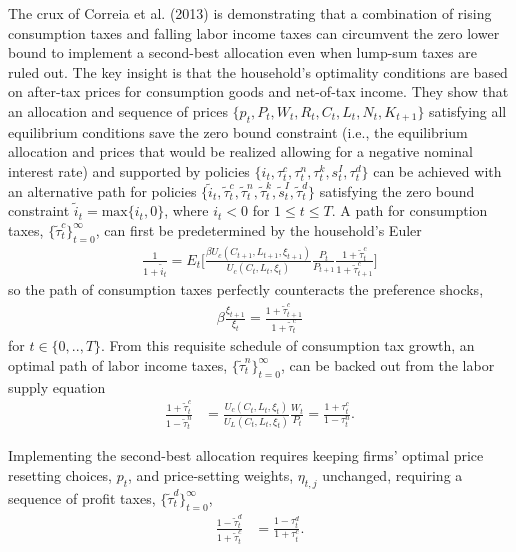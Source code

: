 \documentclass[12pt,letterpaper]{article}
\begin{document}
The crux of Correia et al. (2013) is demonstrating that a combination of rising consumption taxes and falling labor income taxes can circumvent the zero lower bound to implement a second-best allocation even when lump-sum taxes are ruled out.  The key insight is that the household's optimality conditions are based on after-tax prices for consumption goods and net-of-tax income. They show that an allocation and sequence of prices $\{p_t, P_t, W_t, R_t, C_t, L_t, N_t, K_{t+1}\}$ satisfying all equilibrium conditions save the zero bound constraint (i.e., the equilibrium allocation and prices that would be realized allowing for a negative nominal interest rate) and supported by policies $\{i_t, \tau_t^c, \tau_t^n, \tau_t^k, s_t^I, \tau_t^d\}$ can be achieved with an alternative path for policies $\{\tilde{i}_t, \tilde{\tau}_t^c, \tilde{\tau}_t^n, \tilde{\tau}_t^k, \tilde{s}_t^I, \tilde{\tau}_t^d\}$  satisfying the zero bound constraint $\tilde{i}_t = \text{max}\{i_t, 0\}$, where $i_t <0$ for $1 \leq t \leq T$. A path for consumption taxes, $\{ \tilde{\tau}_t^c \}_{t=0}^{\infty}$, can first be predetermined by the household's Euler 
\begin{align}
\frac{1}{1+\tilde{i}_t} = E_t \Big[ \frac{\beta U_c (C_{t+1}, L_{t+1}, \xi_{t+1})}{U_c (C_t, L_t, \xi_t )} \frac{P_t}{P_{t+1}} \frac{1+\tilde{\tau}_t^c} {1+\tilde{\tau}_{t+1}^c}  \Big] \end{align}
so the path of consumption taxes perfectly counteracts the preference shocks,
\begin{align}
\beta \frac{\xi_{t+1}}{\xi_t} = \frac{1 + \tilde{\tau}_{t+1}^{c} }{1 + \tilde{\tau}_t^{c}} 
\end{align}
\noindent for $t \in \{0,..,T\}$. From this requisite schedule of consumption tax growth, an optimal path of labor income taxes, $\{ \tilde{\tau}_t^n \}_{t=0}^{\infty}$, can be backed out from the labor supply equation
\begin{align}
\frac{1+\tilde{\tau}_t^c}{1 - \tilde{\tau}_t^n} &=  \frac{U_c (C_t, L_t, \xi_t )}{U_L (C_t, L_t, \xi_t )}\frac{W_t}{P_t} = \frac{1+\tau_t^c}{1 - \tau_t^n}.  
\end{align}

\noindent Implementing the second-best allocation requires keeping firms' optimal price resetting choices, $p_t$, and price-setting weights, $\eta_{t,j}$ unchanged, requiring a sequence of profit taxes,  $\{ \tilde{\tau}_t^d \}_{t=0}^{\infty}$,
\begin{align}
\frac{1-\tilde{\tau}_t^d}{1 + \tilde{\tau}_t^c} & = \frac{1-\tau_t^d}{1 + \tau_t^c}.  
\end{align}
\end{document}
